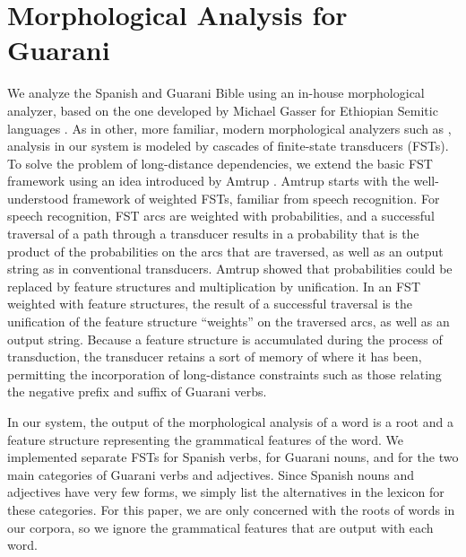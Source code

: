 \documentclass[11pt]{article}
\begin{document}
\section{Morphological Analysis for Guarani}
\label{sec:guaranima}
We analyze the Spanish and Guarani Bible using an in-house morphological
analyzer, based on the one developed by Michael Gasser for Ethiopian Semitic
languages \cite{gasser:eacl09}.  As in other, more familiar, modern
morphological analyzers such as \cite{beesley+karttunen}, analysis in our
system is modeled by cascades of finite-state transducers (FSTs).  To solve the
problem of long-distance dependencies, we extend the basic FST framework using
an idea introduced by Amtrup .  Amtrup starts with the
well-understood framework of weighted FSTs, familiar from speech recognition.
For speech recognition, FST arcs are weighted with probabilities, and a
successful traversal of a path through a transducer results in a probability
that is the product of the probabilities on the arcs that are traversed, as
well as an output string as in conventional transducers.  Amtrup showed that
probabilities could be replaced by feature structures and multiplication by
unification.  In an FST weighted with feature structures, the result of a
successful traversal is the unification of the feature structure ``weights'' on
the traversed arcs, as well as an output string.  Because a feature structure
is accumulated during the process of transduction, the transducer retains a
sort of memory of where it has been, permitting the incorporation of
long-distance constraints such as those relating the negative prefix and suffix
of Guarani verbs.

In our system, the output of the morphological analysis of a word is a root and
a feature structure representing the grammatical features of the word.  We
implemented separate FSTs for Spanish verbs, for Guarani nouns, and for the two
main categories of Guarani verbs and adjectives.  Since Spanish nouns and
adjectives have very few forms, we simply list the alternatives in the lexicon
for these categories.  For this paper, we are only concerned with the roots of
words in our corpora, so we ignore the grammatical features that are output
with each word.
\end{document}
